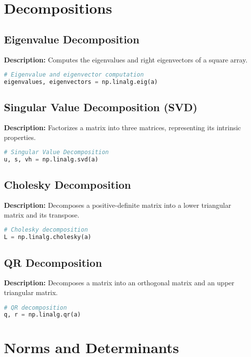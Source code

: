 \documentclass[a4paper, 12pt]{article}
\begin{document}
\section{Decompositions}

\subsection{Eigenvalue Decomposition}
\textbf{Description:} Computes the eigenvalues and right eigenvectors of a square array.

\begin{lstlisting}[language=Python]
# Eigenvalue and eigenvector computation
eigenvalues, eigenvectors = np.linalg.eig(a)
\end{lstlisting}

\subsection{Singular Value Decomposition (SVD)}
\textbf{Description:} Factorizes a matrix into three matrices, representing its intrinsic properties.

\begin{lstlisting}[language=Python]
# Singular Value Decomposition
u, s, vh = np.linalg.svd(a)
\end{lstlisting}

\subsection{Cholesky Decomposition}
\textbf{Description:} Decomposes a positive-definite matrix into a lower triangular matrix and its transpose.

\begin{lstlisting}[language=Python]
# Cholesky decomposition
L = np.linalg.cholesky(a)
\end{lstlisting}

\subsection{QR Decomposition}
\textbf{Description:} Decomposes a matrix into an orthogonal matrix and an upper triangular matrix.

\begin{lstlisting}[language=Python]
# QR decomposition
q, r = np.linalg.qr(a)
\end{lstlisting}

\section{Norms and Determinants}
\end{document}
